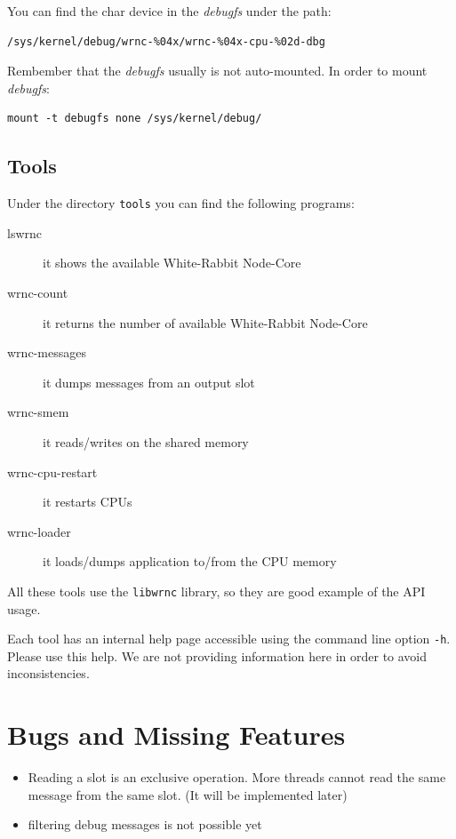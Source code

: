\documentclass[a4paper,10pt]{article}
\begin{document}
You can find the char device in the \textit{debugfs} under the path:
\begin{verbatim}
/sys/kernel/debug/wrnc-%04x/wrnc-%04x-cpu-%02d-dbg
\end{verbatim}

Rembember that the \textit{debugfs} usually is not auto-mounted. In
order to mount \textit{debugfs}:

\begin{verbatim}
mount -t debugfs none /sys/kernel/debug/
\end{verbatim}

\subsection{Tools}%
Under the directory \texttt{tools} you can find the following
programs:

\begin{description}
  \item[lswrnc] it shows the available White-Rabbit Node-Core
  \item[wrnc-count] it returns the number of available White-Rabbit
    Node-Core
  \item[wrnc-messages] it dumps messages from an output slot
  \item[wrnc-smem] it reads/writes on the shared memory
  \item[wrnc-cpu-restart] it restarts CPUs
  \item[wrnc-loader] it loads/dumps application to/from the CPU memory
\end{description}

All these tools use the \texttt{libwrnc} library, so they are good
example of the API usage.

Each tool has an internal help page accessible using the
command line option \texttt{-h}. Please use this help. We are not
providing information here in order to avoid inconsistencies.

\section{Bugs and Missing Features}%
\begin{itemize}
  \item Reading a slot is an exclusive operation. More threads cannot
    read the same message from the same slot. (It will be implemented
    later)
  \item filtering debug messages is not possible yet
\end{itemize}
\end{document}
